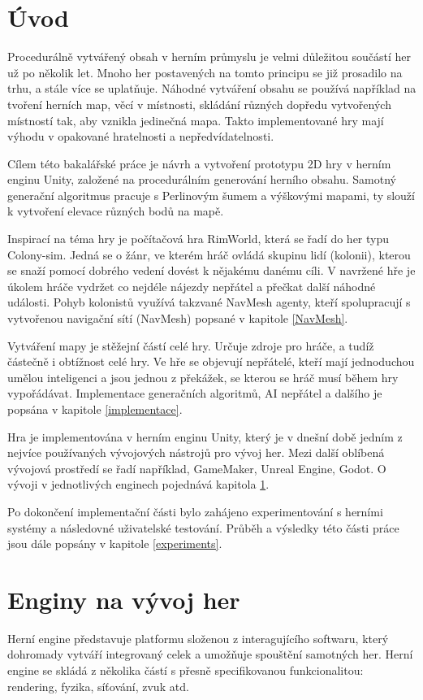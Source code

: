 
\chapter*{Úvod}
Procedurálně vytvářený obsah v herním průmyslu je velmi důležitou součástí her už po několik let. Mnoho her postavených na tomto principu se již prosadilo na trhu, a stále více se uplatňuje. Náhodné vytváření obsahu se používá například na tvoření herních map, věcí v místnosti, skládání různých dopředu vytvořených místností tak, aby vznikla jedinečná mapa. Takto implementované hry mají výhodu v opakované hratelnosti a nepředvídatelnosti.

Cílem této bakalářské práce je návrh a vytvoření prototypu 2D hry v herním enginu Unity, založené na procedurálním generování herního obsahu. Samotný generační algoritmus pracuje s Perlinovým šumem a výškovými mapami, ty slouží k vytvoření elevace různých bodů na mapě.

Inspirací na téma hry je počítačová hra RimWorld, která se řadí do her typu Colony-sim. Jedná se o žánr, ve kterém hráč ovládá skupinu lidí (kolonii), kterou se snaží pomocí dobrého vedení dovést k nějakému danému cíli. V navržené hře je úkolem hráče vydržet co nejdéle nájezdy nepřátel a přečkat další náhodné události. Pohyb kolonistů využívá takzvané NavMesh agenty, kteří spolupracují s vytvořenou navigační sítí (NavMesh) popsané v kapitole \ref{NavMesh}.

Vytváření mapy je stěžejní částí celé hry. Určuje zdroje pro hráče, a tudíž částečně i obtížnost celé hry. Ve hře se objevují nepřátelé, kteří mají jednoduchou umělou inteligenci a jsou jednou z překážek, se kterou se hráč musí během hry vypořádávat. Implementace generačních algoritmů, AI nepřátel a dalšího je popsána v kapitole \ref{implementace}.

Hra je implementována v herním enginu Unity, který je v dnešní době jedním z nejvíce používaných vývojových nástrojů pro vývoj her. Mezi další oblíbená vývojová prostředí se řadí například, GameMaker, Unreal Engine, Godot. O vývoji v jednotlivých enginech pojednává kapitola \ref{engines}.

Po dokončení implementační části bylo zahájeno experimentování s herními systémy a následovné uživatelské testování. Průběh a výsledky této části práce jsou dále popsány v kapitole \ref{experiments}.

\newpage

\chapter{Enginy na vývoj her}
\label{engines}
Herní engine představuje platformu složenou z interagujícího softwaru, který dohromady vytváří integrovaný celek a umožňuje spouštění samotných her. Herní engine se skládá z několika částí s přesně specifikovanou funkcionalitou: rendering, fyzika, síťování, zvuk atd.~\cite{nilson2007game} 


